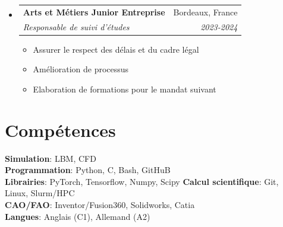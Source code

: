 \documentclass[letterpaper,11pt]{article}
\makeatletter
\newcommand{\resumeItem}[1]{
  \item\small{
    {#1 \vspace{-2pt}}
  }
}
\newcommand{\resumeSubheading}[4]{
  \vspace{-2pt}\item
    \begin{tabular*}{0.97\textwidth}[t]{l@{\extracolsep{\fill}}r}
      \textbf{#1} & #2 \\
      \textit{\small#3} & \textit{\small #4} \\
    \end{tabular*}\vspace{-7pt}
}
\newcommand{\resumeSubSubheading}[2]{
    \item
    \begin{tabular*}{0.97\textwidth}{l@{\extracolsep{\fill}}r}
      \textit{\small#1} & \textit{\small #2} \\
    \end{tabular*}\vspace{-7pt}
}
\newcommand{\resumeSubHeadingListStart}{\begin{itemize}[leftmargin=0.15in, label={}]}
\newcommand{\resumeSubHeadingListEnd}{\end{itemize}}
\newcommand{\resumeItemListStart}{\begin{itemize}}
\newcommand{\resumeItemListEnd}{\end{itemize}\vspace{-5pt}}
\makeatother
\begin{document}
\resumeSubHeadingListStart
\resumeSubheading
{Arts et Métiers Junior Entreprise}{Bordeaux, France}
{Responsable de suivi d'études}{2023-2024}

\resumeItemListStart
\resumeItem{Assurer le respect des délais et du cadre légal}
\resumeItem{Amélioration de processus}
\resumeItem{Elaboration de formations pour le mandat suivant}
\resumeItemListEnd
\resumeSubHeadingListEnd



\section{Compétences}
\begin{itemize}[leftmargin=0.15in, label={}]
  \small{\item{
        \textbf{Simulation}{: LBM, CFD} \\
        \textbf{Programmation}{: Python, C, Bash, GitHuB} \\
        \textbf{Librairies}{: PyTorch, Tensorflow, Numpy, Scipy}
        \textbf{Calcul scientifique}{: Git, Linux, Slurm/HPC} \\
        \textbf{CAO/FAO}{: Inventor/Fusion360, Solidworks, Catia} \\
        \textbf{Langues}{: Anglais (C1), Allemand (A2)}  \\
        }}
\end{itemize}




\end{document}
